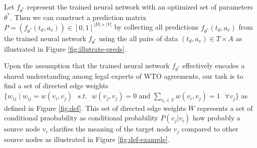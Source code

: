Let $f_{\theta^*}$ represent the trained neural network with an optimized set of parameters $\theta^*$. 
Then we can construct a prediction matrix $P = (f_{\theta^*}(t_d, a_v)) \in [0,1]^{{|D| \times |V|}}$  by collecting all predictions $f_{\theta^*}(t_d, a_v)$ from the trained neural network $f_{\theta^{*}}$ using the all pairs of data $(t_d,a_v) \in T \times A$ as illustrated in Figure \ref{fig:illutrate-preds}.

Upon the assumption that the trained neural network $f_{\theta^*}$ effectively encodes a shared understanding among legal experts of WTO agreements, our task is to find a set of directed edge weights $\{w_{ij} \mid w_{ij} = w(v_i, v_j) \text{ } s.t. \text{ } w(v_j, v_j) = 0 \text{ and } \sum_{v_i\in V}{w(v_i, v_j)} = 1 \text{ } \forall v_j \}$ %
as defined in Figure \ref{fig:def}. %
This set of directed edge weights $W$ represents a set of conditional praobability as conditional probability $P(v_j|v_i)$ how probably a source node $v_i$ clarifies the meaning of the target node $v_j$ compared to other source nodes as illustrated in Figure \ref{fig:def-example}.






